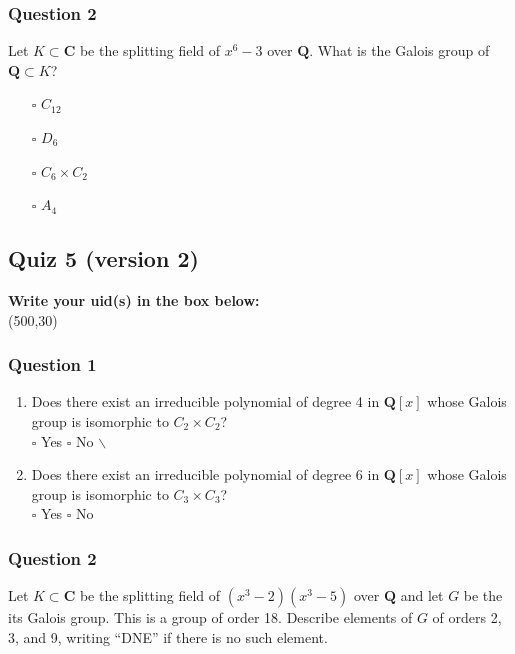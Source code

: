 \documentclass[11pt]{article}
\begin{document}
\subsubsection{Question 2}
\label{sec:org0072af1}
Let \(K \subset \mathbf{C}\) be the splitting field of \(x^6-3\) over \(\mathbf{Q}\).
What is the Galois group of \(\mathbf{Q} \subset K\)?

\begin{itemize}
\item[{$\square$}] \(C_{12}\)\\
\item[{$\square$}] \(D_6\)\\
\item[{$\square$}] \(C_6 \times C_2\)\\
\item[{$\square$}] \(A_4\)
\end{itemize}
\subsection{Quiz 5 (version 2)}
\label{sec:orgaabcef5}
\vspace{1cm}

\noindent
\textbf{Write your uid(s) in the box below:}\\
\framebox(500,30)

\vspace{1cm}
\subsubsection{Question 1}
\label{sec:org8bb22cb}
\begin{enumerate}
\item Does there exist an irreducible polynomial of degree 4 in \(\mathbf{Q}[x]\) whose Galois group is isomorphic to \(C_2 \times C_2\)?\\

\qquad \(\square\) Yes \qquad \(\square\)   No $\backslash$\a

\item Does there exist an irreducible polynomial of degree 6 in \(\mathbf{Q}[x]\) whose Galois group is isomorphic to \(C_3 \times C_3\)?\\

\qquad \(\square\) Yes \qquad \(\square\)   No
\end{enumerate}
\subsubsection{Question 2}
\label{sec:orgc68936c}
Let \(K \subset \mathbf{C}\) be the splitting field of \((x^3-2)(x^3-5)\) over \(\mathbf{Q}\) and let \(G\) be the its Galois group.  This is a group of order 18. Describe elements of \(G\) of orders 2, 3, and 9, writing ``DNE'' if there is no such element.
\end{document}

